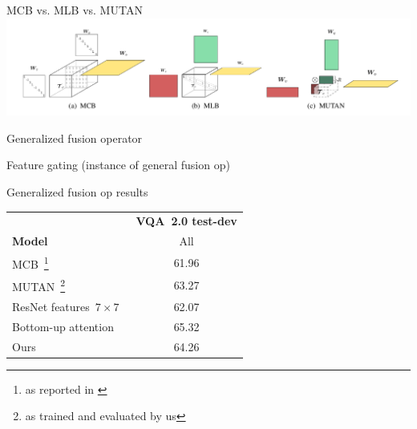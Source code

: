 \documentclass{beamer}
\begin{document}
{%
%
\begin{frame}{MCB vs. MLB vs. MUTAN}
        \center{}
        \hspace*{-0.9cm}
        \includegraphics[scale=0.31]{data/mcb_mlb_mutan}
\end{frame}
}

{%
\begin{frame}{Generalized fusion operator}
\center{}
\hspace*{-6.0cm}
\scalebox{0.75}{%

}
\end{frame}
}

{%
\begin{frame}{Feature gating (instance of general fusion op)}
\centering
\hspace*{-1.0cm}
\scalebox{0.7}{%

}
\end{frame}
}

{%
\begin{frame}{Generalized fusion op results}
\centering
\begin{minipage}{\linewidth}
\begin{tabular}{lc}
& \textbf{VQA~2.0 test-dev} \\
\textbf{Model} & All \\
\midrule
MCB~\cite{DBLP:conf/emnlp/FukuiPYRDR16}\footnote{as reported in \cite{goyal2017making}} & 61.96 \\
MUTAN~\cite{ben2017mutan}\footnote{as trained and evaluated by us} & 63.27 \\
ResNet features~$7 \times 7$~\cite{teney2017tips} & 62.07 \\
Bottom-up attention~\cite{teney2017tips} & 65.32 \\
\midrule
Ours & 64.26 \\
\midrule
\end{tabular}
\end{minipage}
\end{frame}
}
\end{document}
